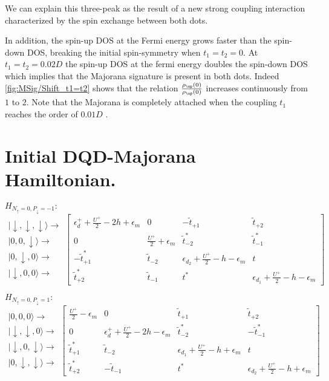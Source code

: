 We can explain this three-peak as the result of a new strong coupling interaction characterized by the spin exchange between both dots. 

In addition, the spin-up DOS at the Fermi energy grows faster than the spin-down DOS, breaking the initial spin-symmetry when $t_1=t_2=0$. At $t_1=t_2=0.02D$ the spin-up DOS at the fermi energy doubles the spin-down DOS which implies that the Majorana signature  is present in both dots. %
Indeed \ref{fig:MSig/Shift_t1=t2} shows that the relation $\frac{\rho_\up(0)}{\rho_\up(0)}$ increases continuously from $1$ to $2$. Note that the Majorana is completely attached when the coupling $t_1$ reaches the order of $0.01D$ .

\section{Initial DQD-Majorana Hamiltonian.\label{chap:Double-Dot-Majorana-Hamiltonian.}}

$H_{N_{\uparrow}=0,P_{\downarrow}=-1}:$
\[
\begin{array}{c}
\vert\downarrow,\downarrow,\downarrow\rangle\rightarrow\\
\vert0,0,\downarrow\rangle\rightarrow\\
\vert0,\downarrow,0\rangle\rightarrow\\
\vert\downarrow,0,0\rangle\rightarrow
\end{array}\left[\begin{array}{cccc}
\epsilon_{d}^{+}+\frac{U^{+}}{2}-2h+\epsilon_{m} & 0 & -\tilde{t}_{+1} & \tilde{t}_{+2}\\
0 & \frac{U^{+}}{2}+\epsilon_{m} & \tilde{t}_{-2}^{*} & \tilde{t}_{-1}^{*}\\
-\tilde{t}_{+1}^{*} & \tilde{t}_{-2} & \epsilon_{d_{2}}+\frac{U^{+}}{2}-h-\epsilon_{m} & t\\
\tilde{t}_{+2}^{*} & \tilde{t}_{-1} & t^{*} & \epsilon_{d_{1}}+\frac{U^{+}}{2}-h-\epsilon_{m}
\end{array}\right]
\]


$H_{N_{\uparrow}=0,P_{\downarrow}=1}:$
\[
\begin{array}{c}
\vert0,0,0\rangle\rightarrow\\
\vert\downarrow,\downarrow,0\rangle\rightarrow\\
\vert\downarrow,0,\downarrow\rangle\rightarrow\\
\vert0,\downarrow,\downarrow\rangle\rightarrow
\end{array}\left[\begin{array}{cccc}
\frac{U^{+}}{2}-\epsilon_{m} & 0 & \tilde{t}_{+1} & \tilde{t}_{+2}\\
0 & \epsilon_{d}^{+}+\frac{U^{+}}{2}-2h-\epsilon_{m} & \tilde{t}_{-2}^{*} & -\tilde{t}_{-1}^{*}\\
\tilde{t}_{+1}^{*} & \tilde{t}_{-2} & \epsilon_{d_{1}}+\frac{U^{+}}{2}-h+\epsilon_{m} & t\\
\tilde{t}_{+2}^{*} & -\tilde{t}_{-1} & t^{*} & \epsilon_{d_{2}}+\frac{U^{+}}{2}-h+\epsilon_{m}
\end{array}\right]
\]


